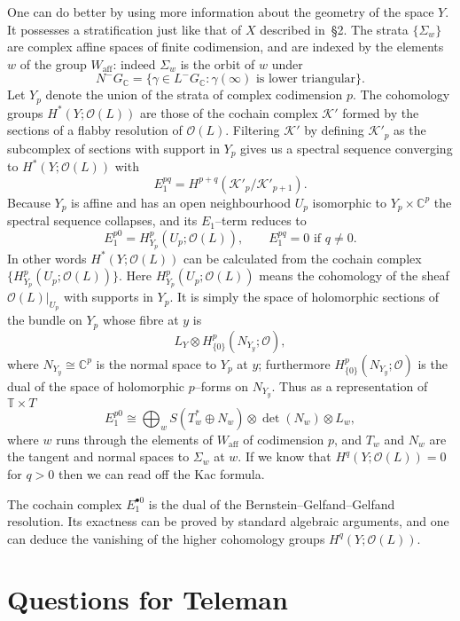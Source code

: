 \documentclass[12pt]{article}
\begin{document}
One can do better by using more information about the geometry
of the space $Y$.  It possesses a stratification just like that of $X$
described in~\S2.
The strata $\{\Sigma_w\}$ are complex affine spaces of finite codimension,
and are indexed by the elements $w$ of the group $W_{\mathrm{aff}}$:
indeed $\Sigma_w$ is the orbit of $w$ under
\[
N^-G_{\mathbb{C}} = \{\gamma \in L^-G_{\mathbb{C}} : \gamma(\infty)
\text{ is lower triangular}\}.
\]
Let $Y_p$ denote the union of the strata of complex codimension $p$.
The cohomology groups $H^*(Y; \mathcal{O}(L))$
are those of the cochain complex $\mathcal{K}'$
formed by the sections of a flabby resolution of $\mathcal{O}(L)$.
Filtering $\mathcal{K}'$ by defining
$\mathcal{K}'_p$ as the subcomplex of sections with support in $Y_p$
gives us a spectral sequence converging to $H^*(Y;\mathcal{O}(L))$
with
\[
E^{pq}_1 = H^{p+q}(\mathcal{K}'_p / \mathcal{K}'_{p+1}).
\]
Because $Y_p$ is affine and has an open neighbourhood
$U_p$ isomorphic to $Y_p \times \mathbb{C}^p$
the spectral sequence collapses, and its $E_1$--term reduces to
\[
E^{p0}_1 = H^p_{Y_p}(U_p; \mathcal{O}(L)), \qquad
E^{pq}_1 = 0 \text{ if } q \ne 0.
\]
In other words $H^*(Y;\mathcal{O}(L))$
can be calculated from the cochain complex
$\{ H^p_{Y_p}(U_p; \mathcal{O}(L)) \}$.
Here $H^p_{Y_p}(U_p; \mathcal{O}(L))$ means the cohomology
of the sheaf $\mathcal{O}(L)|_{U_p}$ with supports in $Y_p$.
It is simply the space of holomorphic sections of the bundle on $Y_p$
whose fibre at $y$ is
\[
L_Y \otimes H^p_{\{0\}}(N_{Y_y}; \mathcal{O}),
\]
where $N_{Y_y} \cong \mathbb{C}^p$ is the normal space to $Y_p$ at $y$;
furthermore $H^p_{\{0\}}(N_{Y_y}; \mathcal{O})$
is the dual of the space of holomorphic $p$--forms on $N_{Y_y}$.
Thus as a representation of $\mathbb{T} \times T$
\[
E^{p0}_1 \cong \bigoplus_{w}
S(T^*_w \oplus N_w) \otimes \det(N_w) \otimes L_w,
\]
where $w$ runs through the elements of $W_{\mathrm{aff}}$
of codimension $p$, and $T_w$ and $N_w$ are the tangent
and normal spaces to $\Sigma_w$ at $w$.
If we know that $H^q(Y; \mathcal{O}(L)) = 0$ for $q>0$
then we can read off the Kac formula.

The cochain complex $E^{\bullet 0}_1$ is the dual of the
Bernstein--Gelfand--Gelfand resolution. Its exactness can be proved by standard algebraic arguments, and one can deduce the vanishing of the higher cohomology groups
$H^q(Y;\mathcal{O}(L))$.
\section{Questions for Teleman}
\end{document}
